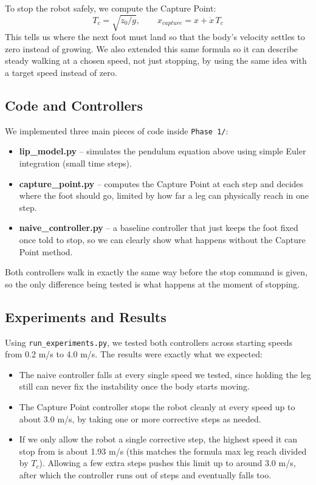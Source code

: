 \documentclass{llncs}
\begin{document}
To stop the robot safely, we compute the Capture Point:
\begin{equation}
T_c = \sqrt{z_0/g}, \qquad x_{capture} = x + \dot{x}\,T_c
\label{eq:capture}
\end{equation}
This tells us where the next foot must land so that the body's velocity settles to zero instead of
growing. We also extended this same formula so it can describe steady walking at a chosen speed,
not just stopping, by using the same idea with a target speed instead of zero.

\subsection{Code and Controllers}
\label{sec:code}

We implemented three main pieces of code inside \texttt{Phase 1/}:

\begin{itemize}[leftmargin=1.5cm]
    \item \textbf{lip\_model.py} -- simulates the pendulum equation above using simple Euler
    integration (small time steps).
    \item \textbf{capture\_point.py} -- computes the Capture Point at each step and decides where
    the foot should go, limited by how far a leg can physically reach in one step.
    \item \textbf{naive\_controller.py} -- a baseline controller that just keeps the foot fixed
    once told to stop, so we can clearly show what happens without the Capture Point method.
\end{itemize}

Both controllers walk in exactly the same way before the stop command is given, so the only
difference being tested is what happens at the moment of stopping.

\subsection{Experiments and Results}
\label{sec:results}

Using \texttt{run\_experiments.py}, we tested both controllers across starting speeds from 0.2
m/s to 4.0 m/s. The results were exactly what we expected:

\begin{itemize}[leftmargin=1.5cm]
    \item The naive controller falls at every single speed we tested, since holding the leg still
    can never fix the instability once the body starts moving.
    \item The Capture Point controller stops the robot cleanly at every speed up to about 3.0
    m/s, by taking one or more corrective steps as needed.
    \item If we only allow the robot a single corrective step, the highest speed it can stop from
    is about 1.93 m/s (this matches the formula max leg reach divided by $T_c$). Allowing a few
    extra steps pushes this limit up to around 3.0 m/s, after which the controller runs out of
    steps and eventually falls too.
\end{itemize}
\end{document}
